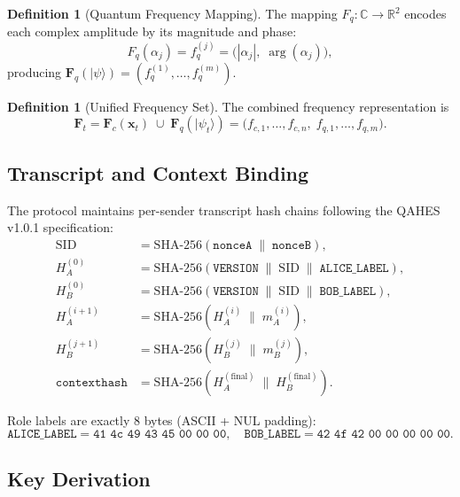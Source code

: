 \documentclass[12pt,letterpaper]{article}
\theoremstyle{plain}
\theoremstyle{definition}
\newtheorem{definition}[theorem]{Definition}
\begin{document}
\begin{definition}[Quantum Frequency Mapping]
The mapping $F_q : \mathbb{C} \to \mathbb{R}^2$ encodes each complex amplitude
by its magnitude and phase:
\[
  F_q(\alpha_j) = f_q^{(j)} = \bigl(|\alpha_j|,\; \arg(\alpha_j)\bigr),
    \tag{6}
\]
producing $\mathbf{F}_q(|\psi\rangle) = (f_q^{(1)}, \ldots, f_q^{(m)})$.
\end{definition}

\begin{definition}[Unified Frequency Set]
The combined frequency representation is
\[
  \mathbf{F}_t = \mathbf{F}_c(\mathbf{x}_t) \;\cup\; \mathbf{F}_q(|\psi_t\rangle)
  = \bigl(f_{c,1}, \ldots, f_{c,n},\; f_{q,1}, \ldots, f_{q,m}\bigr).  \tag{7}
\]
\end{definition}

\subsection{Transcript and Context Binding}

The protocol maintains per-sender transcript hash chains following the QAHES
v1.0.1 specification:
\begin{align}
  \mathrm{SID} &= \mathrm{SHA\text{-}256}(\mathtt{nonceA} \;\|\; \mathtt{nonceB}),
    \tag{8} \\
  H_A^{(0)} &= \mathrm{SHA\text{-}256}(\mathtt{VERSION} \;\|\; \mathrm{SID}
    \;\|\; \mathtt{ALICE\_LABEL}),  \tag{9} \\
  H_B^{(0)} &= \mathrm{SHA\text{-}256}(\mathtt{VERSION} \;\|\; \mathrm{SID}
    \;\|\; \mathtt{BOB\_LABEL}),  \tag{10} \\
  H_A^{(i+1)} &= \mathrm{SHA\text{-}256}(H_A^{(i)} \;\|\; m_A^{(i)}),
    \tag{11} \\
  H_B^{(j+1)} &= \mathrm{SHA\text{-}256}(H_B^{(j)} \;\|\; m_B^{(j)}),
    \tag{12} \\
  \mathtt{contexthash} &= \mathrm{SHA\text{-}256}(H_A^{(\text{final})} \;\|\;
    H_B^{(\text{final})}).  \tag{13}
\end{align}

\noindent Role labels are exactly 8 bytes (ASCII + NUL padding):
\[
  \mathtt{ALICE\_LABEL} = \texttt{41 4c 49 43 45 00 00 00},\quad
  \mathtt{BOB\_LABEL} = \texttt{42 4f 42 00 00 00 00 00}.  \tag{14}
\]

\subsection{Key Derivation}
\end{document}
